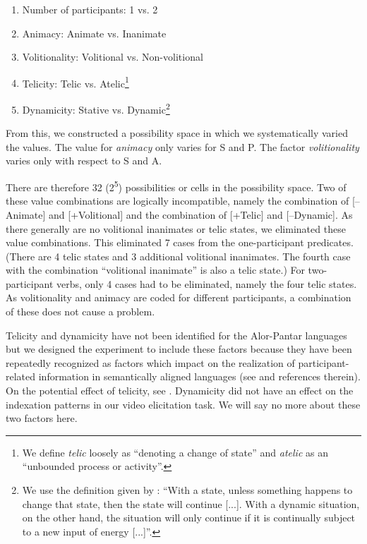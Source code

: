 \begin{enumerate}
\item Number of participants: 1 vs. 2
\item Animacy: Animate vs. Inanimate
\item Volitionality: Volitional vs. Non-volitional
\item Telicity: Telic vs. Atelic\footnote{We define \textit{telic} loosely as ``denoting a change of state'' and \textit{atelic} as an ``unbounded process or activity''.}
\item Dynamicity: Stative vs. Dynamic\footnote{We use the definition given by \citet[49]{Comrie1976}: ``With a state, unless something happens to change that state, then the state will continue [...]. With a dynamic situation, on the other hand, the situation will only continue if it is continually subject to a new input of energy [...]''.}
\end{enumerate}

From this, we constructed a possibility space in which we systematically varied the values. The value for \textit{animacy} only varies for S and P. The factor \textit{volitionality} varies only with respect to S and A. 

There are therefore 32 (2\textsuperscript{5}) possibilities or cells in the possibility space. Two of these value combinations are logically incompatible, namely the combination of [--Animate] and [+Volitional] and the combination of [+Telic] and [--Dynamic]. As there generally are no volitional inanimates or telic states, we eliminated these value combinations. This eliminated 7 cases from the one-participant predicates. (There are 4 telic states and 3 additional volitional inanimates. The fourth case with the combination ``volitional inanimate'' is also a telic state.) For two-participant verbs, only 4 cases had to be eliminated, namely the four telic states. As volitionality and animacy are coded for different participants, a combination of these does not cause a problem. 

Telicity and dynamicity have not been identified for the Alor-Pantar languages but we designed the experiment to include these factors because they have been repeatedly recognized as factors which impact on the realization of participant-related information in semantically aligned languages (see \citet{Arkadiev2008} and references therein). On the potential effect of telicity, see \citet{FeddenEtAl2013}. Dynamicity did not have an effect on the indexation patterns in our video elicitation task. We will say no more about these two factors here.

